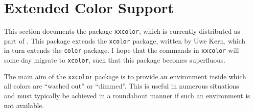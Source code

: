 %
%
%


\section{Extended Color Support}

This section documents the package \texttt{xxcolor}, which is currently
distributed as part of \pgfname. This package extends the \texttt{xcolor}
package, written by Uwe Kern, which in turn extends the \texttt{color} package.
I hope that the commands in \texttt{xxcolor} will some day migrate to
\texttt{xcolor}, such that this package becomes superfluous.

The main aim of the \texttt{xxcolor} package is to provide an environment
inside which all colors are ``washed out'' or ``dimmed''. This is useful in
numerous situations and must typically be achieved in a roundabout manner if
such an environment is not available.

